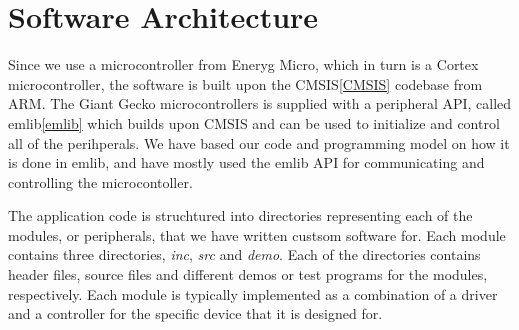\section{Software Architecture}

Since we use a microcontroller from Eneryg Micro, which in turn is a
Cortex microcontroller, the software is built upon the CMSIS\ref{CMSIS} codebase
from ARM.
The Giant Gecko microcontrollers is supplied with a peripheral API,
called emlib\ref{emlib} which builds upon CMSIS and can be used to initialize and 
control all of the perihperals.
We have based our code and programming model on how it is done in emlib, 
and have mostly used the emlib API for communicating and controlling the
microcontoller.


The application code is struchtured into directories representing each of
the modules, or peripherals, that we have written custsom software for.
Each module contains three directories, \textit{inc}, \textit{src} and
\textit{demo}. Each of the directories contains header files, source files
and different demos or test programs for the modules, respectively. 
Each module is typically implemented as a combination of a driver and
a controller for the specific device that it is designed for.

